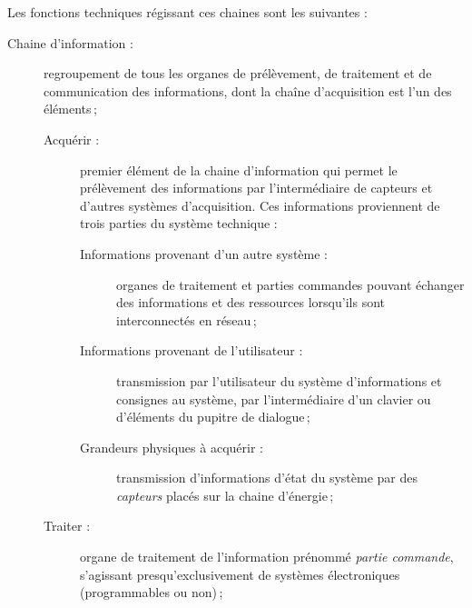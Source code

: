 Les fonctions techniques régissant ces chaines sont les suivantes :
\begin{description}
\item [Chaine d'information :] regroupement de tous les organes de prélèvement, de traitement et de communication des informations, dont la chaîne d'acquisition est l'un des éléments\,;
	\begin{description}
	\item [Acquérir :] premier élément de la chaine d'information qui permet le prélèvement des informations par l'intermédiaire de capteurs et d'autres systèmes d'acquisition. Ces informations proviennent de trois parties du système technique :
		\begin{description}
		\item [Informations provenant d'un autre système :] organes de traitement et parties commandes pouvant échanger des informations et des ressources lorsqu'ils sont interconnectés en réseau\,;
		\item [Informations provenant de l'utilisateur :] transmission par l'utilisateur du système d'informations et consignes au système, par l'intermédiaire d'un clavier ou d'éléments du pupitre de dialogue\,;
		\item [Grandeurs physiques à acquérir :] transmission d'informations d'état du système par des \emph{capteurs} placés sur la chaine d'énergie\,;
		\end{description}
	\item [Traiter :] organe de traitement de l'information prénommé \emph{partie commande}, s'agissant presqu'exclusivement de systèmes électroniques (programmables ou non)\,;
		\begin{description}
		\item []
		\end{description}
	\end{description}
\end{description}







%


